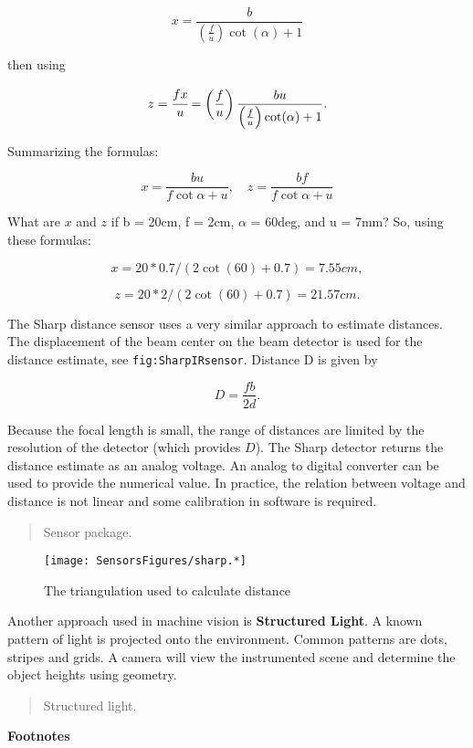 \[x = \frac{b}{\left(\frac{f}{u}\right)\cot(\alpha) + 1}\]

then using

\[z = \cfrac{fx}{u} = \left(\frac{f}{u}\right)\frac{bu}{\left(\frac{f}{u}\right)
\cot(\alpha) + 1} .\]

Summarizing the formulas:

\[x = \frac{b u}{f\cot \alpha + u},  \quad
z = \frac{b f}{f\cot \alpha + u}\]

What are \(x\) and \(z\) if b = 20cm, f = 2cm, \(\alpha\) = 60deg, and u
= 7mm? So, using these formulas:

\[x = 20*0.7/(2\cot(60)+0.7) = 7.55 cm,\]

\[z =
20*2/(2\cot(60)+0.7) = 21.57 cm.\]

The Sharp distance sensor uses a very similar approach to estimate
distances. The displacement of the beam center on the beam detector is
used for the distance estimate, see \texttt{fig:SharpIRsensor}. Distance
D is given by

\[D=  \frac{fb}{2d} .\]

Because the focal length is small, the range of distances are limited by
the resolution of the detector (which provides \(D\)). The Sharp
detector returns the distance estimate as an analog voltage. An analog
to digital converter can be used to provide the numerical value. In
practice, the relation between voltage and distance is not linear and
some calibration in software is required.

\begin{quote}
Sensor package.
\end{quote}

\begin{figure}
\centering
\texttt{[image: SensorsFigures/sharp.*]}
\caption{The triangulation used to calculate distance}
\end{figure}

Another approach used in machine vision is \textbf{Structured Light}. A
known pattern of light is projected onto the environment. Common
patterns are dots, stripes and grids. A camera will view the
instrumented scene and determine the object heights using geometry.

\begin{quote}
Structured light.
\end{quote}

\textbf{Footnotes}
